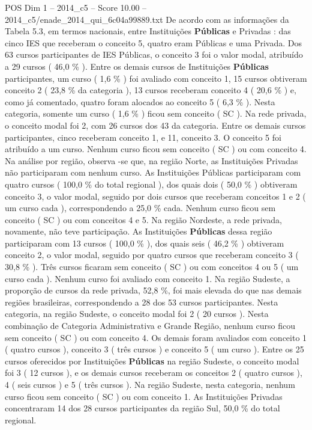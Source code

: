 \begin{textsample}{POS Dim 1 – 2014\_c5 – Score 10.00 – 2014\_c5/enade\_2014\_qui\_6c04a99889.txt}
De acordo com as informações da Tabela 5.3, em termos nacionais, entre Instituições \textbf{Públicas} e Privadas : das cinco IES que receberam o conceito 5, quatro eram Públicas e uma Privada.
Dos 63 cursos participantes de IES Públicas, o conceito 3 foi o valor modal, atribuído a 29 cursos ( 46,0 \% ).
Entre os demais cursos de Instituições \textbf{Públicas} participantes, um curso ( 1,6 \% ) foi avaliado com conceito 1, 15 cursos obtiveram conceito 2 ( 23,8 \% da categoria ), 13 cursos receberam conceito 4 ( 20,6 \% ) e, como já comentado, quatro foram alocados ao conceito 5 ( 6,3 \% ).
Nesta categoria, somente um curso ( 1,6 \% ) ficou sem conceito ( SC ).
Na rede privada, o conceito modal foi 2, com 26 cursos dos 43 da categoria.
Entre os demais cursos participantes, cinco receberam conceito 1, e 11, conceito 3.
O conceito 5 foi atribuído a um curso.
Nenhum curso ficou sem conceito ( SC ) ou com conceito 4.
Na análise por região, observa -se que, na região Norte, as Instituições Privadas não participaram com nenhum curso.
As Instituições Públicas participaram com quatro cursos ( 100,0 \% do total regional ), dos quais dois ( 50,0 \% ) obtiveram conceito 3, o valor modal, seguido por dois cursos que receberam conceitos 1 e 2 ( um curso cada ), correspondendo a 25,0 \% cada.
Nenhum curso ficou sem conceito ( SC ) ou com conceitos 4 e 5.
Na região Nordeste, a rede privada, novamente, não teve participação.
As Instituições \textbf{Públicas} dessa região participaram com 13 cursos ( 100,0 \% ), dos quais seis ( 46,2 \% ) obtiveram conceito 2, o valor modal, seguido por quatro cursos que receberam conceito 3 ( 30,8 \% ).
Três cursos ficaram sem conceito ( SC ) ou com conceitos 4 ou 5 ( um curso cada ).
Nenhum curso foi avaliado com conceito 1.
Na região Sudeste, a proporção de cursos da rede privada, 52,8 \%, foi mais elevada do que nas demais regiões brasileiras, correspondendo a 28 dos 53 cursos participantes.
Nesta categoria, na região Sudeste, o conceito modal foi 2 ( 20 cursos ).
Nesta combinação de Categoria Administrativa e Grande Região, nenhum curso ficou sem conceito ( SC ) ou com conceito 4.
Os demais foram avaliados com conceito 1 ( quatro cursos ), conceito 3 ( três cursos ) e conceito 5 ( um curso ).
Entre os 25 cursos oferecidos por Instituições \textbf{Públicas} na região Sudeste, o conceito modal foi 3 ( 12 cursos ), e os demais cursos receberam os conceitos 2 ( quatro cursos ), 4 ( seis cursos ) e 5 ( três cursos ).
Na região Sudeste, nesta categoria, nenhum curso ficou sem conceito ( SC ) ou com conceito 1.
As Instituições Privadas concentraram 14 dos 28 cursos participantes da região Sul, 50,0 \% do total regional.

\end{textsample}
